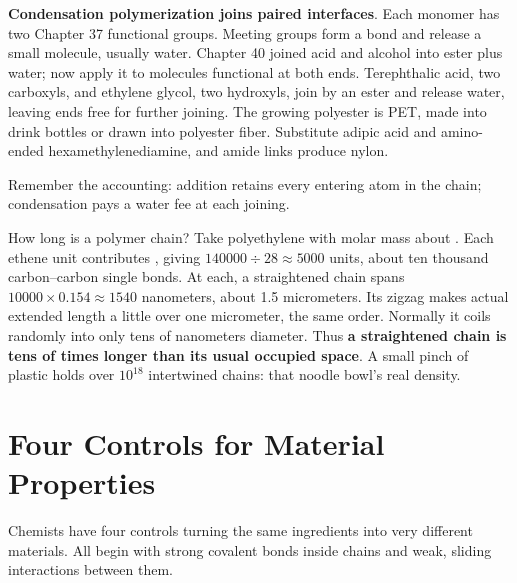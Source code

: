 \textbf{Condensation polymerization joins paired interfaces}. Each monomer has two Chapter 37 functional groups. Meeting groups form a bond and release a small molecule, usually water. Chapter 40 joined acid and alcohol into ester plus water; now apply it to molecules functional at both ends. Terephthalic acid, two carboxyls, and ethylene glycol, two hydroxyls, join by an ester and release water, leaving ends free for further joining. The growing polyester is PET, made into drink bottles or drawn into polyester fiber. Substitute adipic acid and amino-ended hexamethylenediamine, and amide links produce nylon.

Remember the accounting: addition retains every entering atom in the chain; condensation pays a water fee at each joining.

\begin{qiaoliang}
How long is a polymer chain? Take polyethylene with molar mass about . Each ethene unit contributes , giving $140000\div 28\approx 5000$ units, about ten thousand carbon--carbon single bonds. At  each, a straightened chain spans $10000\times 0.154\approx 1540$ nanometers, about 1.5 micrometers. Its zigzag makes actual extended length a little over one micrometer, the same order. Normally it coils randomly into only tens of nanometers diameter. Thus \textbf{a straightened chain is tens of times longer than its usual occupied space}. A small pinch of plastic holds over $10^{18}$ intertwined chains: that noodle bowl's real density.
\end{qiaoliang}

\section{Four Controls for Material Properties}

Chemists have four controls turning the same ingredients into very different materials. All begin with strong covalent bonds inside chains and weak, sliding interactions between them.

